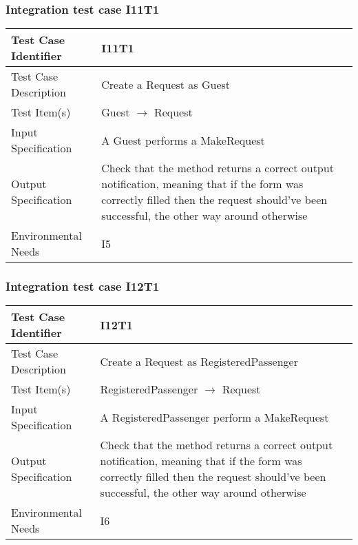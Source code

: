 \subsubsection{Integration test case I11T1}
\begin{center}
  \begin{tabular}{ |l p{10cm}| } \hline
    Test Case Identifier & I11T1 \\ \hline
    Test Case Description & Create a Request as Guest \\ \hline
    Test Item(s) & Guest $\rightarrow$ Request \\ \hline
    Input Specification & A Guest performs a MakeRequest\\ \hline
    Output Specification & Check that the method returns a correct output notification, meaning that if the form was correctly filled then
    the request should've been successful, the other way around otherwise \\ \hline
    Environmental Needs & I5 \\ \hline
  \end{tabular}
\end{center}
\subsubsection{Integration test case I12T1}
\begin{center}
  \begin{tabular}{ |l p{10cm}| } \hline
    Test Case Identifier & I12T1 \\ \hline
    Test Case Description & Create a Request as RegisteredPassenger \\ \hline
    Test Item(s) & RegisteredPassenger $\rightarrow$ Request \\ \hline
    Input Specification & A RegisteredPassenger perform a MakeRequest \\ \hline
    Output Specification & Check that the method returns a correct output notification, meaning that if the form was correctly filled then
    the request should've been successful, the other way around otherwise\\ \hline
    Environmental Needs & I6 \\ \hline
  \end{tabular}
\end{center}
